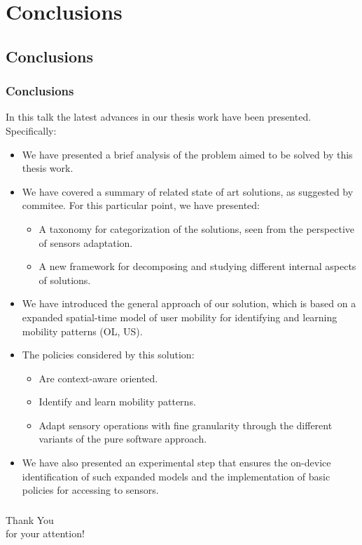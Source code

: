 \documentclass[compress,9pt,xcolor={dvipsnames,table}]{beamer}
\begin{document}
\section{Conclusions}
\subsection{Conclusions}
\begin{frame}\frametitle{Conclusions}
\small
In this talk the latest advances in our thesis work have been presented.
Specifically:
\begin{itemize}
  \item We have presented a brief analysis of the problem aimed to be solved by this thesis work.
  \item We have covered a summary of related state of art solutions, as suggested by commitee.
  For this particular point, we have presented:
  \begin{itemize}
    \item A taxonomy for categorization of the solutions, seen from the perspective of sensors adaptation.
    \item A new framework for decomposing and studying different internal aspects of solutions. 
  \end{itemize}
  \item We have introduced the general approach of our solution, which is based on a expanded spatial-time model of user mobility for identifying and learning mobility patterns (OL, US).
  \item The policies considered by this solution:
  \begin{itemize}
    \item Are context-aware oriented.
    \item Identify and learn mobility patterns.
    \item Adapt sensory operations with fine granularity through the different variants of the pure software approach.
  \end{itemize}
  \item We have also presented an experimental step that ensures the on-device identification of such expanded models and the implementation of basic policies for accessing to sensors. 
\end{itemize}
\end{frame}

\begin{frame}\frametitle{}
\begin{center}
{
\Huge
Thank You\\ for your attention!
}
\end{center}

\end{frame}
\end{document}
